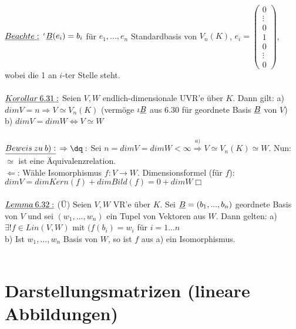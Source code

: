 \documentclass[fleqn, a4paper, 11pt]{article}
\begin{document}
\\
$\uline{Beachte:}$ $^\iota\uline{B}(e_i)=b_i$ f\"ur $e_1,...,e_n$ Standardbasis von $V_n(K)$, $e_i=\begin{pmatrix}
	0 \\
	\vdots\\
	0\\
	1\\
	0\\
	\vdots\\
	0
\end{pmatrix}$, wobei die 1 an $i$-ter Stelle steht.\\
\\
$\uline{Korollar\:6.31:}$ Seien $V,W$ endlich-dimensionale UVR'e \"uber $K$. Dann gilt: a) $dim V=n\Rightarrow V\simeq V_n(K)$ (verm\"oge $\iota\uline{B}$ aus 6.30 f\"ur geordnete Basis $\uline{B}$ von $V$)\\
b) $dim V=dim W\Leftrightarrow V\simeq W$\\
\\
$\uline{Beweis\:zu\:b):}$ \dq$\Rightarrow\dq:$ Sei $n=dim V=dim W<\infty\stackrel{a)}{\Rightarrow}V\simeq V_n(K)\simeq W$. Nun: $\simeq$ ist eine \"Aquivalenzrelation.\\
\dq$\Leftarrow$\dq: W\"ahle Isomorphismus $f:V\rightarrow W$. Dimensionsformel (\dq f\"ur $f$\dq): $dim V=dim Kern(f)+dim Bild(f)=0+dim W$\hfill $\Box$\\
\\
$\uline{Lemma\:6.32:}$ (\"U) Seien $V,W$ VR'e \"uber $K$. Sei $\uline{B}=(b_1,...,b_n)$ geordnete Basis von $V$ und sei $(w_1,...,w_n)$ ein Tupel von Vektoren aus $W$. Dann gelten: a) $\exists !f\in Lin(V,W)$ mit $(f(b_i)=w_i$ f\"ur $i=1...n$\\
b) Ist $w_1,...,w_n$ Basis von $W$, so ist $f$ aus a) ein Isomorphismus.\\
\\
\newpage
\section{Darstellungsmatrizen (lineare Abbildungen)}
\end{document}
